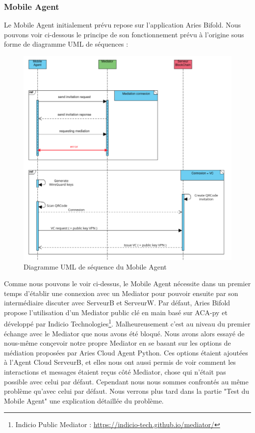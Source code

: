 \documentclass[12pt, openany]{report}
\begin{document}
\subsubsection{Mobile Agent}
\noindent
\begin{flushleft}
Le Mobile Agent initialement prévu repose sur l'application Aries Bifold. Nous pouvons voir ci-dessous le principe de son fonctionnement prévu à l'origine sous forme de diagramme UML de séquences :\\
\begin{figure}[H]
\includegraphics[scale=0.5]{uml-MobileAgent.png}
\centering
\caption{Diagramme UML de séquence du Mobile Agent}
\end{figure}
Comme nous pouvons le voir ci-dessus, le Mobile Agent nécessite dans un premier temps d'établir une connexion avec un Mediator pour pouvoir ensuite par son intermédiaire discuter avec ServeurB et ServeurW. Par défaut, Aries Bifold propose l'utilisation d'un Mediator public clé en main basé sur ACA-py et développé par Indicio Technologies\footnote{Indicio Public Mediator : \url{https://indicio-tech.github.io/mediator/}}. Malheureusement c'est au  niveau du premier échange avec le Mediator que nous avons été bloqué. Nous avons alors essayé de nous-même conçevoir notre propre Mediator en se basant sur les options de médiation proposées par Aries Cloud Agent Python. Ces options étaient ajoutées à l'Agent Cloud ServeurB, et elles nous ont aussi permis de voir comment les interactions et messages étaient reçus côté Mediator, chose qui n'était pas possible avec celui par défaut. Cependant nous nous sommes confrontés au même problème qu'avec celui par défaut. Nous verrons plus tard dans la partie "Test du Mobile Agent" une explication détaillée du problème.\\

\end{flushleft}
\end{document}

